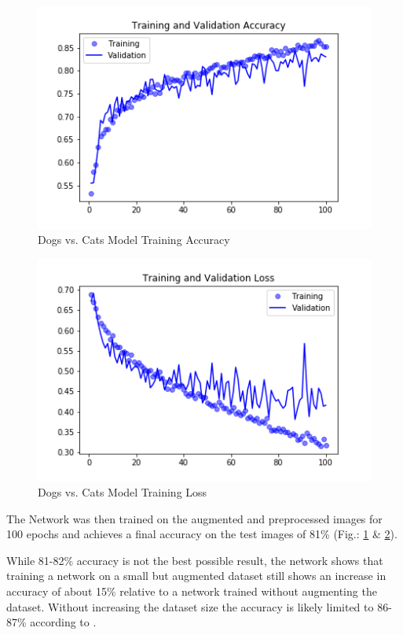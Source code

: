 \documentclass[sigconf]{acmart}
\begin{document}
\begin{figure}[h]
  \centering
  \includegraphics[width=\linewidth]{convnetFromScratch_Accuracy}
  \caption{Dogs vs. Cats Model Training Accuracy}
  \label{fig:CvDAcc}
\end{figure}

\begin{figure}[h]
  \centering
  \includegraphics[width=\linewidth]{convnetFromScratch_Loss}
  \caption{Dogs vs. Cats Model Training Loss}
  \label{fig:CvDLoss}
\end{figure}

The Network was then trained on the augmented and preprocessed images for 100 epochs and achieves a final accuracy on the test images of 81\% (Fig.: \ref{fig:CvDAcc} \& \ref{fig:CvDLoss}).

While 81-82\% accuracy is not the best possible result, the network shows that training a network on a small but augmented dataset still shows an increase in accuracy of about 15\% relative to a network trained without augmenting the dataset.
Without increasing the dataset size the accuracy is likely limited to 86-87\% according to \cite{DLwP}.
\end{document}
